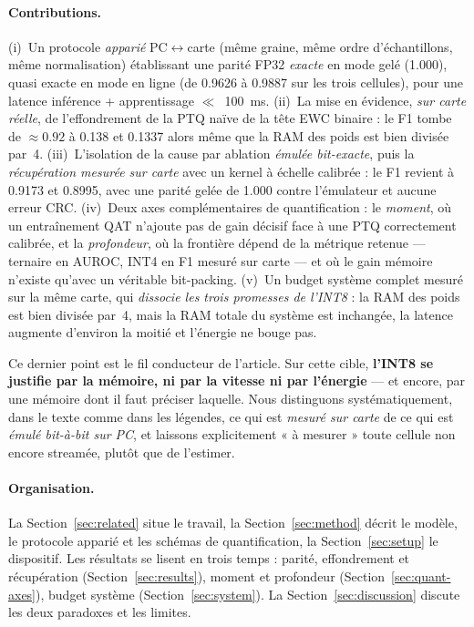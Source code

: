 \paragraph{Contributions.} (i)~Un protocole \emph{apparié} PC$\leftrightarrow$carte (même graine, même
ordre d'échantillons, même normalisation) établissant une parité FP32 \emph{exacte} en mode gelé
(\num{1.000}), quasi exacte en mode en ligne (de \num{0.9626} à \num{0.9887} sur les trois cellules),
pour une latence inférence +
apprentissage $\ll$~\SI{100}{\milli\second}. (ii)~La mise en évidence, \emph{sur carte réelle}, de
l'effondrement de la \gls{PTQ} naïve de la tête EWC binaire : le F1 tombe de $\approx\!\num{0.92}$ à \num{0.138}
et \num{0.1337} alors même que la \gls{RAM} des poids est bien divisée par~4. (iii)~L'isolation de la cause par
ablation \emph{émulée bit-exacte}, puis la \emph{récupération mesurée sur carte} avec un kernel à échelle
calibrée : le F1 revient à \num{0.9173} et \num{0.8995}, avec une parité gelée de \num{1.000} contre
l'émulateur et aucune erreur \gls{CRC}. (iv)~Deux axes complémentaires de quantification : le \emph{moment}, où
un entraînement \gls{QAT} n'ajoute pas de gain décisif face à une PTQ correctement calibrée, et la
\emph{profondeur}, où la frontière dépend de la métrique retenue --- ternaire en AUROC, INT4 en F1 mesuré
sur carte --- et où le gain mémoire n'existe qu'avec un véritable bit-packing. (v)~Un budget système complet mesuré sur la même carte, qui \emph{dissocie les trois
promesses de l'INT8} : la RAM des poids est bien divisée par~4, mais la RAM totale du système est
inchangée, la latence augmente d'environ la moitié et l'énergie ne bouge pas.

Ce dernier point est le fil conducteur de l'article. Sur cette cible, \textbf{l'INT8 se justifie par la
mémoire, ni par la vitesse ni par l'énergie} --- et encore, par une mémoire dont il faut préciser laquelle.
Nous distinguons systématiquement, dans le texte comme dans les légendes, ce qui est \emph{mesuré sur
carte} de ce qui est \emph{émulé bit-à-bit sur PC}, et laissons explicitement « à mesurer » toute cellule
non encore streamée, plutôt que de l'estimer.

\paragraph{Organisation.} La Section~\ref{sec:related} situe le travail, la Section~\ref{sec:method}
décrit le modèle, le protocole apparié et les schémas de quantification, la Section~\ref{sec:setup} le
dispositif. Les résultats se lisent en trois temps : parité, effondrement et récupération
(Section~\ref{sec:results}), moment et profondeur (Section~\ref{sec:quant-axes}), budget système
(Section~\ref{sec:system}). La Section~\ref{sec:discussion} discute les deux paradoxes et les limites.
